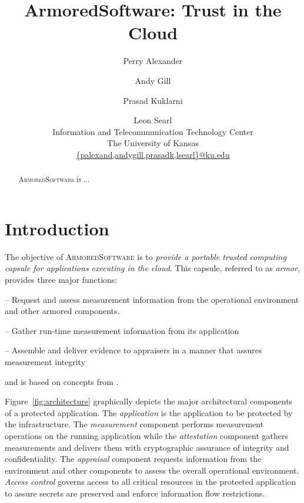 \documentclass[10pt]{article}
\title{ArmoredSoftware: Trust in the Cloud}
\author{Perry Alexander \and Andy Gill \and Prasad Kuklarni \and Leon
  Searl \\
Information and Telecommunication Technology Center \\
The University of Kansas \\
\url{{palexand,andygill,prasadk,lsearl}@ku.edu}}
\begin{document}

\begin{abstract}
  \textsc{ArmoredSoftware} is ...
\end{abstract}

\section{Introduction}

The objective of \textsc{ArmoredSoftware} is to \emph{provide a portable
trusted computing capsule for applications executing in the cloud}.
This capsule, referred to as \emph{armor}, provides three major
functions:

\begin{description}
  \parskip=0pt\itemsep=0pt
\item[Appraisal] -- Request and assess measurement information from
  the operational environment and other armored components.
\item[Measurement] -- Gather run-time measurement information from its
  application
\item[Attestation] -- Assemble and deliver evidence to appraisers in a
  manner that assures measurement integrity
\end{description}

\noindent and is based on concepts from \citet{Coker::Principles-of-R}. 

Figure~\ref{fig:architecture} graphically depicts the major
architectural components of a protected application.  The
\emph{application} is the application to be protected by the
infrastructure.  The \emph{measurement} component performs measurement
operations on the running application while the \emph{attestation}
component gathers measurements and delivers them with cryptographic
assurance of integrity and confidentiality.  The \emph{appraisal}
component requests information from the environment and other
components to assess the overall operational environment.
\emph{Access control} governs access to all critical resources in the
protected application to assure secrets are preserved and enforce
information flow restrictions.
\end{document}
